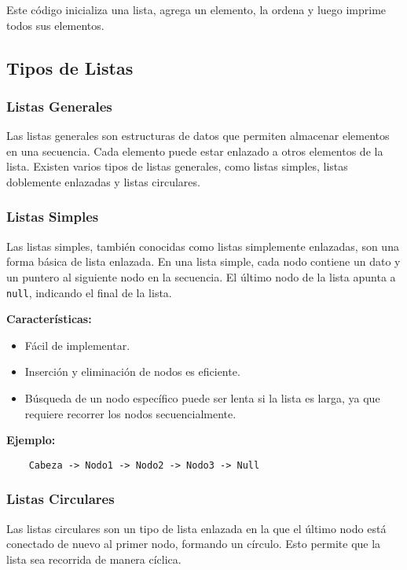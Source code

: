     Este código inicializa una lista, agrega un elemento, la ordena y luego imprime todos sus elementos.
    
    \subsection{Tipos de Listas}
    
    \subsubsection{Listas Generales}
    Las listas generales son estructuras de datos que permiten almacenar elementos en una secuencia. Cada elemento puede estar enlazado a otros elementos de la lista. Existen varios tipos de listas generales, como listas simples, listas doblemente enlazadas y listas circulares.
    
    \subsubsection{Listas Simples}
    Las listas simples, también conocidas como listas simplemente enlazadas, son una forma básica de lista enlazada. En una lista simple, cada nodo contiene un dato y un puntero al siguiente nodo en la secuencia. El último nodo de la lista apunta a \texttt{null}, indicando el final de la lista.
    
    \textbf{Características:}
    \begin{itemize}
        \item Fácil de implementar.
        \item Inserción y eliminación de nodos es eficiente.
        \item Búsqueda de un nodo específico puede ser lenta si la lista es larga, ya que requiere recorrer los nodos secuencialmente.
    \end{itemize}
    
    \textbf{Ejemplo:}
    \begin{verbatim}
    Cabeza -> Nodo1 -> Nodo2 -> Nodo3 -> Null
    \end{verbatim}
    
    \subsubsection{Listas Circulares}
    Las listas circulares son un tipo de lista enlazada en la que el último nodo está conectado de nuevo al primer nodo, formando un círculo. Esto permite que la lista sea recorrida de manera cíclica.
    
